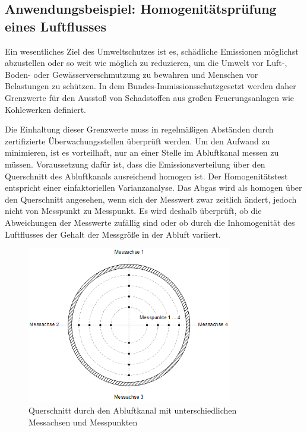 \clearpage

\subsection{Anwendungsbeispiel: Homogenit\"{a}tspr\"{u}fung eines Luftflusses}

\noindent Ein wesentliches Ziel des Umweltschutzes ist es, sch\"{a}dliche Emissionen m\"{o}glichst abzustellen oder so weit wie m\"{o}glich zu reduzieren, um die Umwelt vor Luft-, Boden- oder Gew\"{a}sserverschmutzung zu bewahren und Menschen vor Belastungen zu sch\"{u}tzen. In dem Bundes-Immissionsschutzgesetzt werden daher Grenzwerte f\"{u}r den Aussto{\ss} von Schadstoffen aus gro{\ss}en Feuerungsanlagen wie Kohlewerken definiert.\newline

\noindent Die Einhaltung dieser Grenzwerte muss in regelm\"{a}{\ss}igen Abst\"{a}nden durch zertifizierte \"{U}berwachungsstellen \"{u}berpr\"{u}ft werden. Um den Aufwand zu minimieren, ist es vorteilhaft, nur an einer Stelle im Abluftkanal messen zu m\"{u}ssen. Voraussetzung daf\"{u}r ist, dass die Emissionsverteilung \"{u}ber den Querschnitt des Abluftkanals ausreichend homogen ist. Der Homogenit\"{a}tstest entspricht einer einfaktoriellen Varianzanalyse. Das Abgas wird als homogen \"{u}ber den Querschnitt angesehen, wenn sich der Messwert zwar zeitlich \"{a}ndert, jedoch nicht von Messpunkt zu Messpunkt. Es wird deshalb \"{u}berpr\"{u}ft, ob die Abweichungen der Messwerte zuf\"{a}llig sind oder ob durch die Inhomogenit\"{a}t des Luftflusses der Gehalt der Messgr\"{o}{\ss}e in der Abluft variiert.

\noindent 
\begin{figure}[H]
  \centerline{\includegraphics[width=0.8\textwidth]{Kapitel9/Bilder/image5}}
  \caption{Querschnitt durch den Abluftkanal mit unterschiedlichen Messachsen und Messpunkten}
  \label{fig:QuerschnittAbluftrohr}
\end{figure}


